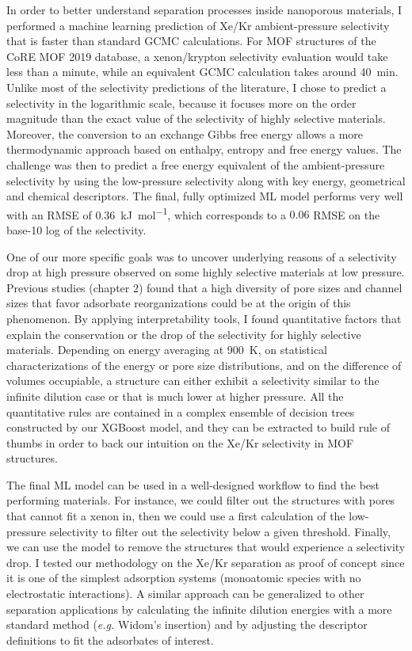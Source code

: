 \documentclass[main]{subfiles}
\begin{document}
In order to better understand separation processes inside nanoporous materials, I performed a machine learning prediction of Xe/Kr ambient-pressure selectivity that is faster than standard GCMC calculations. For MOF structures of the CoRE MOF 2019 database, a xenon/krypton selectivity evaluation would take less than a minute, while an equivalent GCMC calculation takes around \SI{40}{\minute}. Unlike most of the selectivity predictions of the literature, I chose to predict a selectivity in the logarithmic scale, because it focuses more on the order magnitude than the exact value of the selectivity of highly selective materials. Moreover, the conversion to an exchange Gibbs free energy allows a more thermodynamic approach based on enthalpy, entropy and free energy values. The challenge was then to predict a free energy equivalent of the ambient-pressure selectivity by using the low-pressure selectivity along with key energy, geometrical and chemical descriptors. The final, fully optimized ML model performs very well with an RMSE of \SI{0.36}{\kilo\joule\per\mole}, which corresponds to a $0.06$ RMSE on the base-10 log of the selectivity.

One of our more specific goals was to uncover underlying reasons of a selectivity drop at high pressure observed on some highly selective materials at low pressure. Previous studies (chapter 2) found that a high diversity of pore sizes and channel sizes that favor adsorbate reorganizations could be at the origin of this phenomenon. By applying interpretability tools, I found quantitative factors that explain the conservation or the drop of the selectivity for highly selective materials. Depending on energy averaging at \SI{900}{\kelvin}, on statistical characterizations of the energy or pore size distributions, and on the difference of volumes occupiable, a structure can either exhibit a selectivity similar to the infinite dilution case or that is much lower at higher pressure. All the quantitative rules are contained in a complex ensemble of decision trees constructed by our XGBoost model, and they can be extracted to build rule of thumbs in order to back our intuition on the Xe/Kr selectivity in MOF structures.

The final ML model can be used in a well-designed workflow to find the best performing materials. For instance, we could filter out the structures with pores that cannot fit a xenon in, then we could use a first calculation of the low-pressure selectivity to filter out the selectivity below a given threshold. Finally, we can use the model to remove the structures that would experience a selectivity drop. I tested our methodology on the Xe/Kr separation as proof of concept since it is one of the simplest adsorption systems (monoatomic species with no electrostatic interactions). A similar approach can be generalized to other separation applications by calculating the infinite dilution energies with a more standard method (\emph{e.g.} Widom's insertion) and by adjusting the descriptor definitions to fit the adsorbates of interest.
\end{document}
